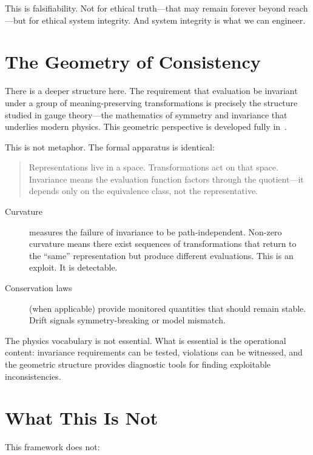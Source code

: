 \documentclass[12pt]{article}
\begin{document}
This is falsifiability. Not for ethical truth---that may remain forever beyond reach---but
for ethical system integrity. And system integrity is what we can engineer.

\section{The Geometry of Consistency}

There is a deeper structure here. The requirement that evaluation be invariant under
a group of meaning-preserving transformations is precisely the structure studied in
gauge theory---the mathematics of symmetry and invariance that underlies modern
physics. This geometric perspective is developed fully in~\cite{bond2026ge}.

This is not metaphor. The formal apparatus is identical:

\begin{quotation}
Representations live in a space. Transformations act on that space. Invariance
means the evaluation function factors through the quotient---it depends only
on the equivalence class, not the representative.
\end{quotation}

\begin{description}
  \item[Curvature] measures the failure of invariance to be path-independent. Non-zero
    curvature means there exist sequences of transformations that return to
    the ``same'' representation but produce different evaluations. This is an
    exploit. It is detectable.
  \item[Conservation laws] (when applicable) provide monitored quantities that
    should remain stable. Drift signals symmetry-breaking or model mismatch.
\end{description}

The physics vocabulary is not essential. What is essential is the operational content:
invariance requirements can be tested, violations can be witnessed, and the
geometric structure provides diagnostic tools for finding exploitable inconsistencies.

\section{What This Is Not}

This framework does not:
\end{document}
